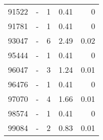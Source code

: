 \begin{longtable}{lXrrr}
        91522 & \multicolumn{1}{X}{-} & %
          \num{1} &
          \num[round-mode=places,round-precision=2]{0,41} &
          \num[round-mode=places,round-precision=2]{0} \\

        91781 & \multicolumn{1}{X}{-} & %
          \num{1} &
          \num[round-mode=places,round-precision=2]{0,41} &
          \num[round-mode=places,round-precision=2]{0} \\

        93047 & \multicolumn{1}{X}{-} & %
          \num{6} &
          \num[round-mode=places,round-precision=2]{2,49} &
          \num[round-mode=places,round-precision=2]{0,02} \\

        95444 & \multicolumn{1}{X}{-} & %
          \num{1} &
          \num[round-mode=places,round-precision=2]{0,41} &
          \num[round-mode=places,round-precision=2]{0} \\

        96047 & \multicolumn{1}{X}{-} & %
          \num{3} &
          \num[round-mode=places,round-precision=2]{1,24} &
          \num[round-mode=places,round-precision=2]{0,01} \\

        96476 & \multicolumn{1}{X}{-} & %
          \num{1} &
          \num[round-mode=places,round-precision=2]{0,41} &
          \num[round-mode=places,round-precision=2]{0} \\

        97070 & \multicolumn{1}{X}{-} & %
          \num{4} &
          \num[round-mode=places,round-precision=2]{1,66} &
          \num[round-mode=places,round-precision=2]{0,01} \\

        98574 & \multicolumn{1}{X}{-} & %
          \num{1} &
          \num[round-mode=places,round-precision=2]{0,41} &
          \num[round-mode=places,round-precision=2]{0} \\

        99084 & \multicolumn{1}{X}{-} & %
          \num{2} &
          \num[round-mode=places,round-precision=2]{0,83} &
          \num[round-mode=places,round-precision=2]{0,01} \\


\end{longtable}
